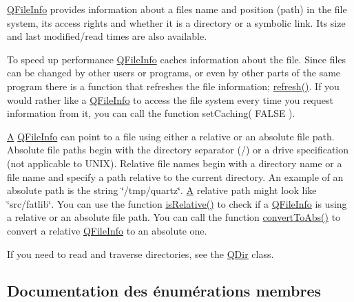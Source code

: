 \hyperlink{class_q_file_info}{Q\+File\+Info} provides information about a file\textquotesingle{}s name and position (path) in the file system, its access rights and whether it is a directory or a symbolic link. Its size and last modified/read times are also available.

To speed up performance \hyperlink{class_q_file_info}{Q\+File\+Info} caches information about the file. Since files can be changed by other users or programs, or even by other parts of the same program there is a function that refreshes the file information; \hyperlink{class_q_file_info_aed469b2b04fe04a80424e8d94f7d9978}{refresh()}. If you would rather like a \hyperlink{class_q_file_info}{Q\+File\+Info} to access the file system every time you request information from it, you can call the function set\+Caching( F\+A\+L\+S\+E ).

\hyperlink{class_a}{A} \hyperlink{class_q_file_info}{Q\+File\+Info} can point to a file using either a relative or an absolute file path. Absolute file paths begin with the directory separator (\textquotesingle{}/\textquotesingle{}) or a drive specification (not applicable to U\+N\+I\+X). Relative file names begin with a directory name or a file name and specify a path relative to the current directory. An example of an absolute path is the string \char`\"{}/tmp/quartz\char`\"{}. \hyperlink{class_a}{A} relative path might look like \char`\"{}src/fatlib\char`\"{}. You can use the function \hyperlink{class_q_file_info_a5bb164facc2c9197c74868cfce06c14a}{is\+Relative()} to check if a \hyperlink{class_q_file_info}{Q\+File\+Info} is using a relative or an absolute file path. You can call the function \hyperlink{class_q_file_info_a3a4b0328b3fd423e0cfb0747445760b8}{convert\+To\+Abs()} to convert a relative \hyperlink{class_q_file_info}{Q\+File\+Info} to an absolute one.

If you need to read and traverse directories, see the \hyperlink{class_q_dir}{Q\+Dir} class. 

\subsection{Documentation des énumérations membres}
\hypertarget{class_q_file_info_a7fa0cd94ba7f096133efda899aeafab9}{}
